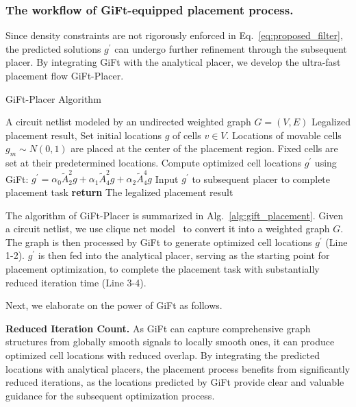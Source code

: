 \subsubsection{The workflow of GiFt-equipped placement process.}
Since density constraints are not rigorously enforced in Eq.~\ref{eq:proposed_filter}, the predicted solutions $g^{\prime}$ can undergo further refinement through the subsequent placer. By integrating GiFt with the analytical placer, we develop the ultra-fast placement flow GiFt-Placer. 


\begin{algorithm}[]
    \renewcommand{\algorithmicrequire}{\textbf{Input:}}
    \renewcommand{\algorithmicensure}{\textbf{Output:}}
    \small \caption{GiFt-Placer Algorithm} \label{alg:gift_placement}
    \footnotesize
    \begin{algorithmic}[1]
        \REQUIRE A circuit netlist modeled by an undirected weighted graph $G = (V, E)$
        \ENSURE  Legalized placement result,
        \STATE Set initial locations $g$ of cells $v \in V$. Locations of movable cells $g_m \sim N(0,1)$ are placed at the center of the placement region. Fixed cells are set at their predetermined locations.
        \STATE Compute optimized cell locations $g^{\prime}$ using GiFt: $g^{\prime}=\alpha_0\tilde{A}_2^2g+\alpha_1\tilde{A}_4^2g+\alpha_2\tilde{A}_4^4g$
        \STATE Input $g^{\prime}$ to subsequent placer to complete placement task
        \STATE \textbf{return} The legalized placement result
    \end{algorithmic}
\end{algorithm}


The algorithm of GiFt-Placer is summarized in Alg.~\ref{alg:gift_placement}.
Given a circuit netlist, we use clique net model~\cite{clique} to convert it into a weighted graph $G$. The graph is then processed by GiFt to generate optimized cell locations $g^{\prime}$ (Line 1-2). $g^{\prime}$ is then fed into the analytical placer, serving as the starting point for placement optimization, to complete the placement task with substantially reduced iteration time (Line 3-4).

Next, we elaborate on the power of GiFt as follows.

\textbf{Reduced Iteration Count. }
As GiFt can capture comprehensive graph structures from globally smooth signals to locally smooth ones, it can produce optimized cell locations with reduced overlap. By integrating the predicted locations with analytical placers, the placement process benefits from significantly reduced iterations, as the locations predicted by GiFt provide clear and valuable guidance for the subsequent optimization process.

